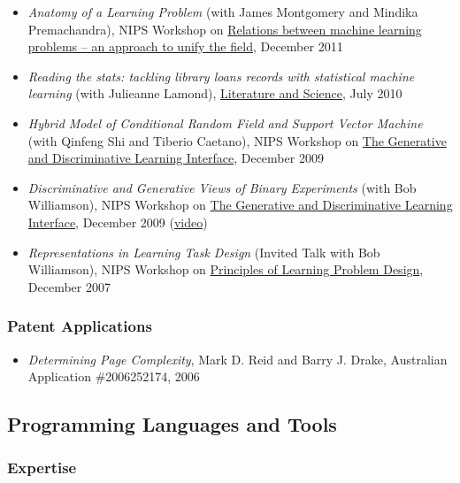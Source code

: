 \documentclass{article}
\begin{document}
\begin{itemize}%
\item \emph{Anatomy of a Learning Problem} (with James Montgomery and Mindika Premachandra), NIPS Workshop on \href{http://rml.cecs.anu.edu.au/}{Relations between machine learning problems – an approach to unify the field}, December 2011
\item \emph{Reading the stats: tackling library loans records with statistical machine learning} (with Julieanne Lamond), \href{http://www.aal.asn.au/conference/2010/}{Literature and Science}, July 2010
\item \emph{Hybrid Model of Conditional Random Field and Support Vector Machine} (with Qinfeng Shi and Tiberio Caetano), NIPS Workshop on \href{http://gen-disc2009.wikidot.com/}{The Generative and Discriminative Learning Interface}, December 2009
\item \emph{Discriminative and Generative Views of Binary Experiments} (with Bob Williamson), NIPS Workshop on \href{http://gen-disc2009.wikidot.com/}{The Generative and Discriminative Learning Interface}, December 2009 (\href{http://gen-disc2009.wdfiles.com/local--files/schedule/gendisc09-williamson.pdf}{video})
\item \emph{Representations in Learning Task Design} (Invited Talk with Bob Williamson), NIPS Workshop on \href{http://hunch.net/~learning-problem-design/}{Principles of Learning Problem Design}, December 2007

\end{itemize}
\hypertarget{patent_applications}{}\subsubsection*{{Patent Applications}}\label{patent_applications}

\begin{itemize}%
\item \emph{Determining Page Complexity}, Mark D. Reid and Barry J. Drake, Australian Application \#2006252174, 2006

\end{itemize}
\hypertarget{programming_languages_and_tools}{}\subsection*{{Programming Languages and Tools}}\label{programming_languages_and_tools}

\hypertarget{expertise}{}\subsubsection*{{Expertise}}\label{expertise}
\end{document}
